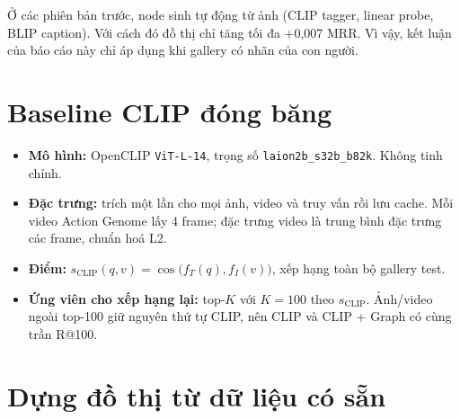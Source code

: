\documentclass[11pt,a4paper]{article}
\begin{document}
Ở các phiên bản trước, node sinh tự động từ ảnh (CLIP tagger, linear probe, BLIP caption). Với cách đó đồ thị chỉ tăng tối đa +0,007 MRR. Vì vậy, kết luận của báo cáo này chỉ áp dụng khi gallery có nhãn của con người.

\section{Baseline CLIP đóng băng}\label{sec:baseline}

\begin{itemize}
  \item \textbf{Mô hình:} OpenCLIP \texttt{ViT-L-14}, trọng số \texttt{laion2b\_s32b\_b82k}. Không tinh chỉnh.
  \item \textbf{Đặc trưng:} trích một lần cho mọi ảnh, video và truy vấn rồi lưu cache. Mỗi video Action Genome lấy 4 frame; đặc trưng video là trung bình đặc trưng các frame, chuẩn hoá L2.
  \item \textbf{Điểm:} \(s_{\text{CLIP}}(q,v)=\cos\big(f_T(q), f_I(v)\big)\), xếp hạng toàn bộ gallery test.
  \item \textbf{Ứng viên cho xếp hạng lại:} top-\(K\) với \(K=100\) theo \(s_{\text{CLIP}}\). Ảnh/video ngoài top-100 giữ nguyên thứ tự CLIP, nên CLIP và CLIP + Graph có cùng trần R@100.
\end{itemize}

\section{Dựng đồ thị từ dữ liệu có sẵn}\label{sec:graph}
\end{document}
